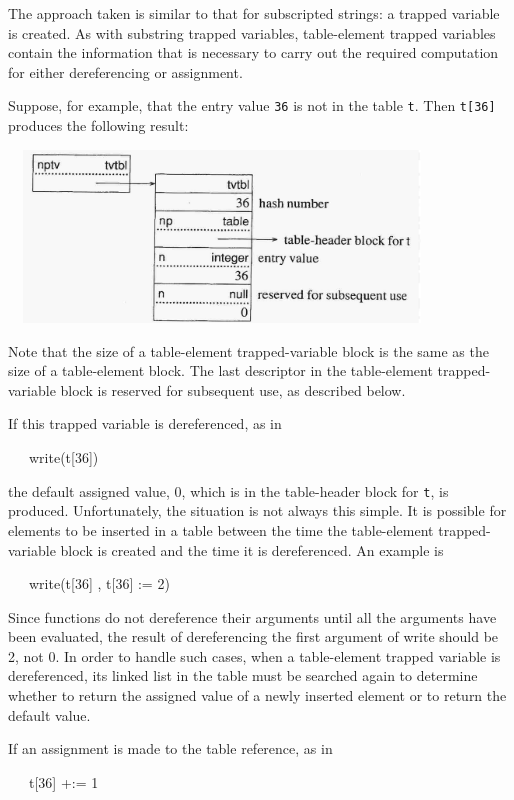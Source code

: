 The approach taken is similar to that for subscripted strings: a
trapped variable is created. As with substring trapped variables,
table-element trapped variables contain the information that is
necessary to carry out the required computation for either
dereferencing or assignment.

Suppose, for example, that the entry value \texttt{36} is not in the
table \texttt{t}. Then \texttt{t[36]} produces the following result:

\ \  \includegraphics[width=4.1681in,height=1.8071in]{ib-img/ib-img041.jpg} 

Note that the size of a table-element trapped-variable block is the
same as the size of a table-element block. The last descriptor in the
table-element trapped-variable block is reserved for subsequent use,
as described below.

If this trapped variable is dereferenced, as in

{\ttfamily\mdseries
\ \ \ write(t[36])}

\noindent the default assigned value, 0, which is in the table-header
block for \texttt{t}, is produced. Unfortunately, the situation is not
always this simple. It is possible for elements to be inserted in a
table between the time the table-element trapped-variable block is
created and the time it is dereferenced. An example is

{\ttfamily\mdseries
\ \ \ write(t[36] , t[36] := 2)}

Since functions do not dereference their arguments until all the
arguments have been evaluated, the result of dereferencing the first
argument of write should be 2, not 0. In order to handle such cases,
when a table-element trapped variable is dereferenced, its linked list
in the table must be searched again to determine whether to return the
assigned value of a newly inserted element or to return the default
value.

If an assignment is made to the table reference, as in

{\ttfamily\mdseries
\ \ \ t[36] +:= 1}

